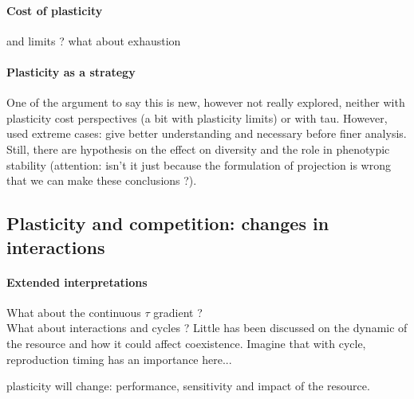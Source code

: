 \paragraph{Cost of plasticity}

and limits ? what about exhaustion

\paragraph{Plasticity as a strategy}
One of the argument to say this is new, however not really explored, neither with plasticity cost perspectives (a bit with plasticity limits) or with tau. However, used extreme cases: give better understanding and necessary before finer analysis. Still, there are hypothesis on the effect on diversity and the role in phenotypic stability (attention: isn't it just because the formulation of projection is wrong that we can make these conclusions ?).



\subsection{Plasticity and competition: changes in interactions}

\paragraph{Extended interpretations}
What about the continuous $\tau$ gradient ?\\

What about interactions and cycles ? Little has been discussed on the dynamic of the resource and how it could affect coexistence. Imagine that with cycle, reproduction timing has an importance here...


plasticity will change: performance, sensitivity and impact of the resource.


